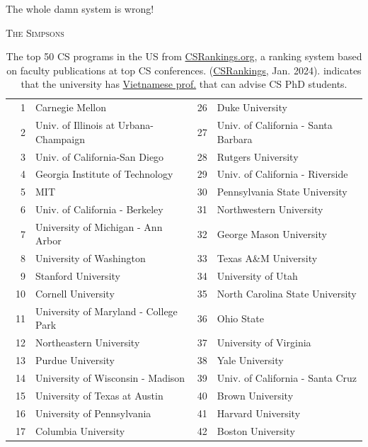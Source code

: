 \documentclass[oneside,11pt,dvipsnames]{book}
\newcommand{\red}[1]{{\color{red}{#1}}}
\begin{document}
\epigraph{\vspace{-0.2in} The whole damn system is wrong!}{\textsc{The Simpsons}}


\begin{table}[h]
  \centering
  \small
  \caption{The top 50 CS programs in the US from \href{https://www.csrankings.org}{CSRankings.org}, a ranking system  based on faculty publications at top CS conferences. (\href{https://csrankings.org}{CSRankings}, Jan. 2024). \red{$^*$} indicates that the university has \href{https://github.com/dynaroars/dynaroars.github.io/wiki/Viet-CS-Profs-US}{Vietnamese prof.} that can advise CS PhD students.}\label{tab:ranking}
  \begin{tabular}{rl|rl}
    \toprule
    1 & Carnegie Mellon & 26 & Duke University \\
    2 & Univ. of Illinois at Urbana-Champaign\red{$^*$}  & 27 & Univ. of California - Santa Barbara \\
    3 & Univ. of California-San Diego & 28 & Rutgers University\red{$^*$} \\
    4 & Georgia Institute of Technology & 29 & Univ. of California - Riverside\\
    5 & MIT                            & 30 & Pennsylvania State University  \\
    6 & Univ. of California - Berkeley& 31 & Northwestern University\\
    7 & University of Michigan - Ann Arbor\red{$^*$}   & 32& George Mason University\red{$^*$}\\
    8 & University of Washington      &33 &  Texas A\&M University\red{$^*$} \\
    9 &  Stanford University  &34&  University of Utah \\
    10 & Cornell University  & 35 &  North Carolina State University\\\
    11 & University of Maryland - College Park &  36& Ohio State \\
    12 & Northeastern University\red{$^*$} &37& University of Virginia  \\
    13 & Purdue University &38& Yale University \\
    14 & University of Wisconsin - Madison\red{$^*$} &39 & Univ. of California - Santa Cruz \\
    15 & University of Texas at Austin &40& Brown University \\
    16 & University of Pennsylvania &41 & Harvard University \\
    17 & Columbia University\red{$^*$} &42 & Boston University  \\

\end{tabular}
\end{table}
\end{document}

